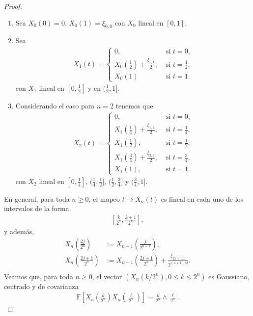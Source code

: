 \begin{proof}
	\begin{enumerate}
	\item Sea $X_0 (0) = 0$, $X_0 (1) = \xi_{0, 0}$ con $X_0$ lineal en $[0, 1]$.
	\item Sea 
		\begin{align*}
		X_1 (t) = 
			\begin{cases}
			0, & \text{ si } t = 0, \\
			X_0 (\frac{1}{2}) + \frac{\xi_{1, 1}}{2}, & \text{ si } t = \frac{1}{2}, \\
			X_0 (1) & \text{ si } t = 1.
			\end{cases}
		\end{align*}
	con $X_1$ lineal en $[0, \frac{1}{2}]$ y en $(\frac{1}{2}, 1]$. 
	\item Considerando el caso para $n = 2$ tenemos que
		\begin{align*}
		X_2 (t) = 
			\begin{cases}
			0, & \text{ si } t = 0, \\
			X_1 (\frac{1}{4}) + \frac{\xi_{1, 2}}{2}, & \text{ si } t = \frac{1}{4}, \\
			X_1 (\frac{1}{2}), & \text{ si } t = \frac{1}{2}, \\
			X_1 (\frac{3}{4}) + \frac{\xi_{2, 2}}{2}, & \text{ si } t = \frac{3}{4}, \\
			X_1 (1), & \text{ si } t = 1.
			\end{cases}
		\end{align*}
	con $X_2$ lineal en $[0, \frac{1}{4}]$, $(\frac{1}{4}, \frac{1}{2}]$, $(\frac{1}{2}, \frac{3}{4}]$ y $(\frac{3}{4}, 1]$.
	\end{enumerate}
En general, para toda $n \geq 0$, el mapeo $t \rightarrow X_n (t)$ es lineal en cada uno de los intervalos de la forma
	\begin{align*}
		\left[ \frac{k}{2^n}, \frac{k+1}{2^n} \right],
	\end{align*}
y además, 
	\begin{align*}
		X_n \left(\frac{2j}{2^n}\right) & := X_{n-1} \left(\frac{j}{2^{n-1}}\right), \\
		X_n \left(\frac{2j + 1}{2^n}\right) & := X_{n-1} \left(\frac{2j + 1}{2^n}\right) + \frac{\xi_{2j + 1, n}}{2^{(n+1)/2}}. \\
	\end{align*}
Veamos que, para toda $n \geq 0$, el vector $(X_n(k / 2^n), 0 \leq k \leq 2^n)$ es Gaussiano, centrado y de covarianza
	\begin{align}
		\mathbb{E} \left[ X_n \left( \frac{k}{2^n} \right) X_n \left( \frac{\ell}{2^n} \right) \right] = \frac{k}{2^n} \wedge \frac{\ell}{2^n}. \label{abv}

\end{align}
\end{proof}
